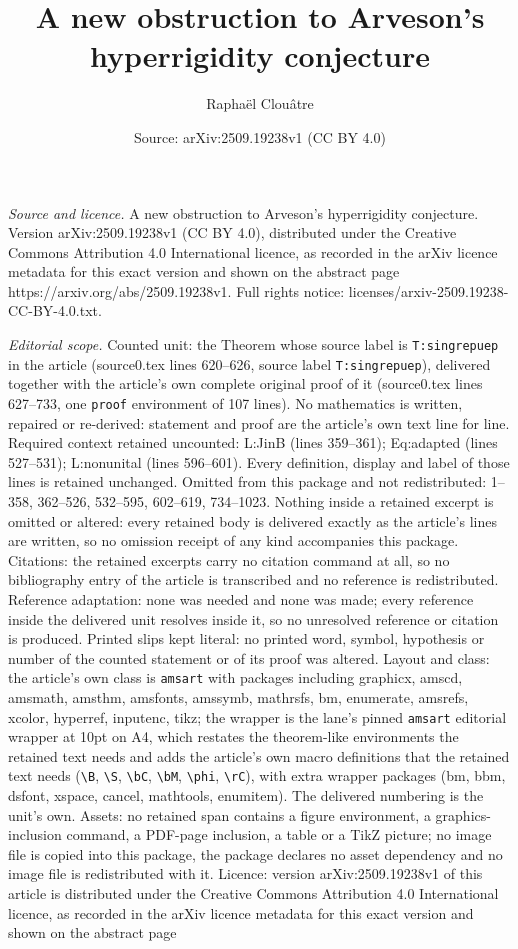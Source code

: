 \documentclass[10pt,a4paper]{amsart}
\title[A new obstruction to Arveson's hyperrigidity conjecture]{A new obstruction to Arveson's hyperrigidity conjecture}
\author{Rapha\"el Clou\^atre}
\date{Source: arXiv:2509.19238v1 (CC BY 4.0)}
\begin{document}
\maketitle

\noindent\emph{Source and licence.} A new obstruction to Arveson's hyperrigidity conjecture. Version arXiv:2509.19238v1 (CC BY 4.0), distributed under the Creative Commons Attribution 4.0 International licence, as recorded in the arXiv licence metadata for this exact version and shown on the abstract page https://arxiv.org/abs/2509.19238v1. Full rights notice: licenses/arxiv-2509.19238-CC-BY-4.0.txt.\par\smallskip

\noindent\textit{Editorial scope.} Counted unit: the Theorem whose source label is \texttt{T:singrepuep} in the article (source0.tex lines 620--626, source label \texttt{T:singrepuep}), delivered together with the article's own complete original proof of it (source0.tex lines 627--733, one \texttt{proof} environment of 107 lines). No mathematics is written, repaired or re-derived: statement and proof are the article's own text line for line. Required context retained uncounted: L:JinB (lines 359--361); Eq:adapted (lines 527--531); L:nonunital (lines 596--601). Every definition, display and label of those lines is retained unchanged. Omitted from this package and not redistributed: 1--358, 362--526, 532--595, 602--619, 734--1023. Nothing inside a retained excerpt is omitted or altered: every retained body is delivered exactly as the article's lines are written, so no omission receipt of any kind accompanies this package. Citations: the retained excerpts carry no citation command at all, so no bibliography entry of the article is transcribed and no reference is redistributed. Reference adaptation: none was needed and none was made; every reference inside the delivered unit resolves inside it, so no unresolved reference or citation is produced. Printed slips kept literal: no printed word, symbol, hypothesis or number of the counted statement or of its proof was altered. Layout and class: the article's own class is \texttt{amsart} with packages including graphicx, amscd, amsmath, amsthm, amsfonts, amssymb, mathrsfs, bm, enumerate, amsrefs, xcolor, hyperref, inputenc, tikz; the wrapper is the lane's pinned \texttt{amsart} editorial wrapper at 10pt on A4, which restates the theorem-like environments the retained text needs and adds the article's own macro definitions that the retained text needs (\texttt{\textbackslash B}, \texttt{\textbackslash S}, \texttt{\textbackslash bC}, \texttt{\textbackslash bM}, \texttt{\textbackslash phi}, \texttt{\textbackslash rC}), with extra wrapper packages (bm, bbm, dsfont, xspace, cancel, mathtools, enumitem). The delivered numbering is the unit's own. Assets: no retained span contains a figure environment, a graphics-inclusion command, a PDF-page inclusion, a table or a TikZ picture; no image file is copied into this package, the package declares no asset dependency and no image file is redistributed with it. Licence: version arXiv:2509.19238v1 of this article is distributed under the Creative Commons Attribution 4.0 International licence, as recorded in the arXiv licence metadata for this exact version and shown on the abstract page 
\end{document}
